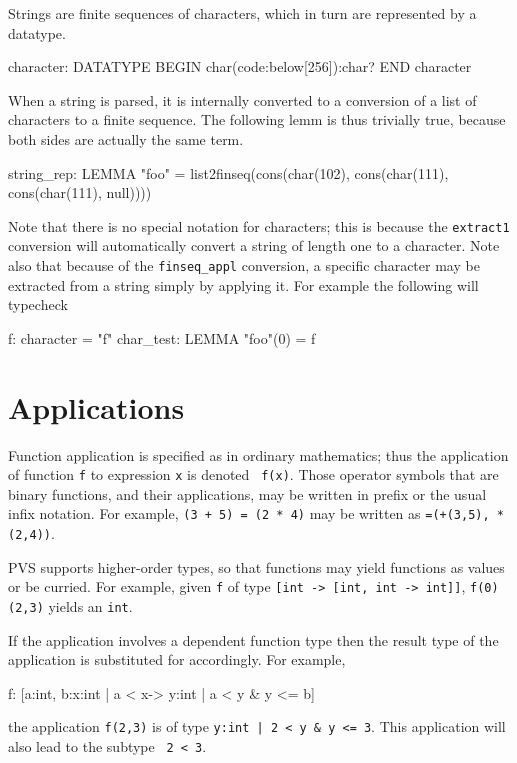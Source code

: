 Strings are finite sequences of characters, which in turn are represented
by a datatype.
\begin{pvsex}
  character: DATATYPE
   BEGIN
    char(code:below[256]):char?
   END character
\end{pvsex}
When a string is parsed, it is internally converted to a conversion of a
list of characters to a finite sequence.  The following lemm is thus
trivially true, because both sides are actually the same term.
\begin{pvsex}
  string_rep: LEMMA
    "foo" = list2finseq(cons(char(102),
                             cons(char(111),
                                  cons(char(111), null))))
\end{pvsex}
Note that there is no special notation for characters; this is because the
\texttt{extract1} conversion will automatically convert a string of length
one to a character.  Note also that because of the \texttt{finseq\_appl}
conversion, a specific character may be extracted from a string simply by
applying it.  For example the following will typecheck
\begin{pvsex}
  f: character = "f"
  char_test: LEMMA "foo"(0) = f
\end{pvsex}  

\section{Applications}

Function application is specified as in ordinary mathematics; thus the
application of function \texttt{f} to expression \texttt{x} is denoted \texttt{
f(x)}.  Those operator symbols that are binary functions, and their
applications, may be written in prefix or the usual infix notation.  For
example, \texttt{(3 + 5) = (2 * 4)} may be written as \texttt{=(+(3,5),
*(2,4))}.

PVS supports higher-order types, so that functions may yield functions
as values or be curried.  For example, given
\texttt{f} of type \texttt{[int -> [int, int -> int]]}, \texttt{f(0)(2,3)}
yields an \texttt{int}.

If the application involves a dependent function type then the result
type of the application is substituted for accordingly.  For example,
\begin{pvsex}
  f: [a:int, b:\setb{}x:int | a < x\sete -> \setb{}y:int | a < y & y <= b\sete]
\end{pvsex}
the application \texttt{f(2,3)} is of type \texttt{\setb{}y:int | 2 < y \& y <=
3\sete}.  This application will also lead to the subtype \tcc\ \texttt{2 < 3}.

